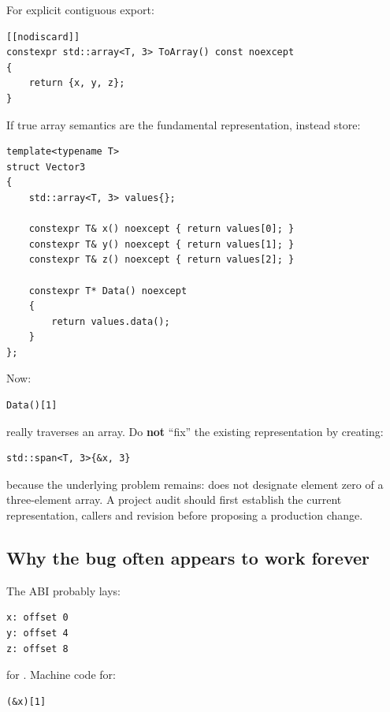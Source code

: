 For explicit contiguous export:

\begin{verbatim}
[[nodiscard]]
constexpr std::array<T, 3> ToArray() const noexcept
{
    return {x, y, z};
}
\end{verbatim}

If true array semantics are the fundamental representation, instead store:

\begin{verbatim}
template<typename T>
struct Vector3
{
    std::array<T, 3> values{};

    constexpr T& x() noexcept { return values[0]; }
    constexpr T& y() noexcept { return values[1]; }
    constexpr T& z() noexcept { return values[2]; }

    constexpr T* Data() noexcept
    {
        return values.data();
    }
};
\end{verbatim}

Now:

\begin{verbatim}
Data()[1]
\end{verbatim}

really traverses an array. Do \textbf{not} ``fix'' the existing representation by creating:

\begin{verbatim}
std::span<T, 3>{&x, 3}
\end{verbatim}

because the underlying problem remains:  does not designate element zero of a three-element  array. A project audit should first establish the current representation, callers and revision before proposing a production change.

\subsection{Why the bug often appears to work forever}\label{01-foundations-i-ch003-why-the-bug-often-appears-to-work-forever}

\hypertarget{01-foundations-i-ch003-why-the-bug-often-appears-to-work-forever}{}

The ABI probably lays:

\begin{verbatim}
x: offset 0
y: offset 4
z: offset 8
\end{verbatim}

for . Machine code for:

\begin{verbatim}
(&x)[1]
\end{verbatim}

